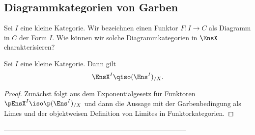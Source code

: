 \subsection{Diagrammkategorien von Garben}

Sei $I$ eine kleine Kategorie. Wir bezeichnen einen Funktor $F: I \to
C$ als Diagramm in $C$ der Form $I$. Wie können wir solche
Diagrammkategorien in $\EnsX$ charakterisieren?

\begin{prop}
  Sei $I$ eine kleine Kategorie. Dann gilt
  \[ \EnsX^I \qiso (\Ens^I)_{/X}. \]
\end{prop}
\begin{proof}
  Zunächst folgt aus dem Exponentialgesetz für Funktoren
  $\pEnsX^I \iso \p (\Ens^I)_{/X}$ und dann die Aussage mit der
  Garbenbedingung als Limes und der objektweisen Definition von
  Limites in Funktorkategorien.
\end{proof}

--------------------------------------------------------------------------------


